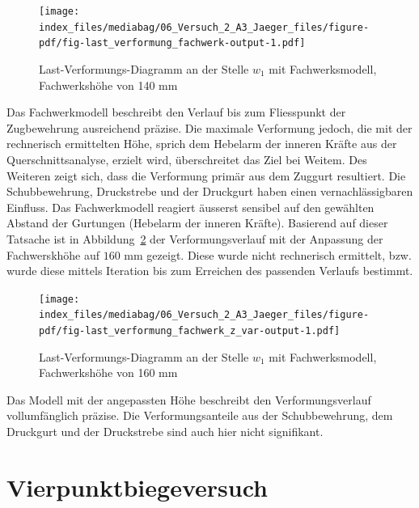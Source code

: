 \documentclass[
  12pt,
  letterpaper,
  egregdoesnotlikesansseriftitles]{scrreprt}
\begin{document}
\begin{figure}[H]

{\centering \texttt{[image: index\_files/mediabag/06\_Versuch\_2\_A3\_Jaeger\_files/figure-pdf/fig-last\_verformung\_fachwerk-output-1.pdf]}

}

\caption{\label{fig-last_verformung_fachwerk}Last-Verformungs-Diagramm
an der Stelle \(w_1\) mit Fachwerksmodell, Fachwerkshöhe von 140 mm}

\end{figure}

Das Fachwerkmodell beschreibt den Verlauf bis zum Fliesspunkt der
Zugbewehrung ausreichend präzise. Die maximale Verformung jedoch, die
mit der rechnerisch ermittelten Höhe, sprich dem Hebelarm der inneren
Kräfte aus der Querschnittsanalyse, erzielt wird, überschreitet das Ziel
bei Weitem. Des Weiteren zeigt sich, dass die Verformung primär aus dem
Zuggurt resultiert. Die Schubbewehrung, Druckstrebe und der Druckgurt
haben einen vernachlässigbaren Einfluss. Das Fachwerkmodell reagiert
äusserst sensibel auf den gewählten Abstand der Gurtungen (Hebelarm der
inneren Kräfte). Basierend auf dieser Tatsache ist in
Abbildung~\ref{fig-last_verformung_fachwerk_z_var} der
Verformungsverlauf mit der Anpassung der Fachwerskhöhe auf
\(160\text{ mm}\) gezeigt. Diese wurde nicht rechnerisch ermittelt, bzw.
wurde diese mittels Iteration bis zum Erreichen des passenden Verlaufs
bestimmt.

\begin{figure}[H]

{\centering \texttt{[image: index\_files/mediabag/06\_Versuch\_2\_A3\_Jaeger\_files/figure-pdf/fig-last\_verformung\_fachwerk\_z\_var-output-1.pdf]}

}

\caption{\label{fig-last_verformung_fachwerk_z_var}Last-Verformungs-Diagramm
an der Stelle \(w_1\) mit Fachwerksmodell, Fachwerkshöhe von 160 mm}

\end{figure}

Das Modell mit der angepassten Höhe beschreibt den Verformungsverlauf
vollumfänglich präzise. Die Verformungsanteile aus der Schubbewehrung,
dem Druckgurt und der Druckstrebe sind auch hier nicht signifikant.


\hypertarget{sec-vierpunkt}{%
\chapter{Vierpunktbiegeversuch}\label{sec-vierpunkt}}
\end{document}
